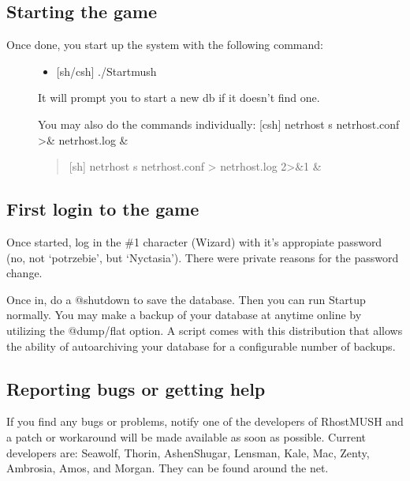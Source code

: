 \documentclass[letterpaper,10pt,english]{sphinxmanual}
\begin{document}
\subsection{Starting the game}
\label{\detokenize{installation:starting-the-game}}\begin{description}
\item[{Once done, you start up the system with the following command:}] \leavevmode\begin{itemize}
\item {} 
\sphinxAtStartPar
{[}sh/csh{]} ./Startmush

\end{itemize}

\sphinxAtStartPar
It will prompt you to start a new db if it doesn’t find one.

\sphinxAtStartPar
You may also do the commands individually:
\sphinxhyphen{} {[}csh{]} netrhost \sphinxhyphen{}s netrhost.conf \textgreater{}\& netrhost.log \&
\begin{quote}

\sphinxAtStartPar
{[}sh{]}  netrhost \sphinxhyphen{}s netrhost.conf \textgreater{} netrhost.log 2\textgreater{}\&1 \&
\end{quote}

\end{description}


\subsection{First login to the game}
\label{\detokenize{installation:first-login-to-the-game}}
\sphinxAtStartPar
Once started, log in the \#1 character (Wizard) with it’s appropiate
password (no, not ‘potrzebie’, but ‘Nyctasia’).  There were private
reasons for the password change.

\sphinxAtStartPar
Once in, do a @shutdown to save the database.  Then you can run Startup
normally.   You may make a backup of your database at anytime on\sphinxhyphen{}line by
utilizing the @dump/flat option.  A script comes with this distribution
that allows the ability of auto\sphinxhyphen{}archiving your database for a configurable
number of backups.


\subsection{Reporting bugs or getting help}
\label{\detokenize{installation:reporting-bugs-or-getting-help}}
\sphinxAtStartPar
If you find any bugs or problems, notify one of the developers of RhostMUSH and
a patch or workaround will be made available as soon as possible.  Current
developers are:  Seawolf, Thorin, Ashen\sphinxhyphen{}Shugar, Lensman, Kale, Mac, Zenty,
Ambrosia, Amos, and Morgan.  They can be found around the net.
\end{document}
